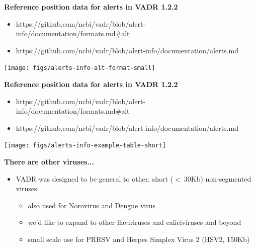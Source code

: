 \documentclass[landscape]{slides}
\begin{document}
\begin{slide}
\begin{center}
\large{\textbf{Reference position data for alerts in VADR 1.2.2}}

\small
\begin{itemize}
\item https://github.com/ncbi/vadr/blob/alert-info/documentation/formats.md\#alt

\item https://github.com/ncbi/vadr/blob/alert-info/documentation/alerts.md
\end{itemize}

\texttt{[image: figs/alerts-info-alt-format-small]}

\end{center}

\vfill
\end{slide}
\begin{slide}
\begin{center}
\large{\textbf{Reference position data for alerts in VADR 1.2.2}}

\small
\begin{itemize}
\item https://github.com/ncbi/vadr/blob/alert-info/documentation/formats.md\#alt

\item https://github.com/ncbi/vadr/blob/alert-info/documentation/alerts.md
\end{itemize}

\texttt{[image: figs/alerts-info-example-table-short]}

\end{center}

\vfill
\end{slide}
\begin{slide}
\begin{center}
\large{\textbf{There are other viruses...}}

\normalsize
\begin{itemize}
\item VADR was designed to be general to other, short ($<~30$Kb)
  non-segmented viruses
  \begin{itemize}
  \item also used for Norovirus and Dengue virus
  \item we'd like to expand to other flaviriruses and caliciviruses
    and beyond
  \item small scale use for PRRSV and Herpes Simplex Virus 2 (HSV2,
    150Kb)
  \end{itemize}
\end{itemize}

\end{center}
\vfill
\end{slide}
\end{document}
